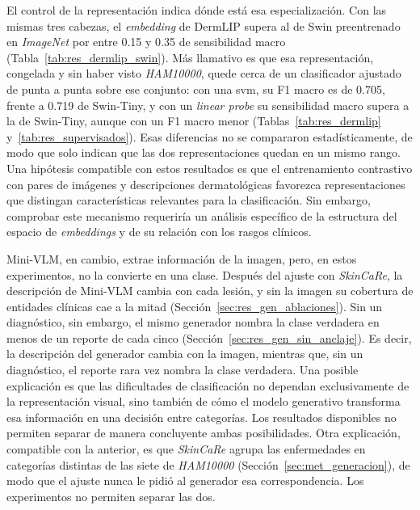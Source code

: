 El control de la representación indica dónde está esa especialización. Con las mismas tres cabezas, el
\emph{embedding} de DermLIP supera al de Swin preentrenado en \emph{ImageNet} por entre 0.15 y 0.35 de sensibilidad
macro (Tabla~\ref{tab:res_dermlip_swin}). Más llamativo es que esa representación, congelada y sin haber visto
\emph{HAM10000}, quede cerca de un clasificador ajustado de punta a punta sobre ese conjunto: con una \gls{svm}, su F1
macro es de 0.705, frente a 0.719 de Swin-Tiny, y con un \emph{linear probe} su sensibilidad macro supera a la de
Swin-Tiny, aunque con un F1 macro menor (Tablas~\ref{tab:res_dermlip} y~\ref{tab:res_supervisados}). Esas diferencias
no se compararon estadísticamente, de modo que solo indican que las dos representaciones quedan en un mismo rango. Una hipótesis compatible con estos resultados es que el entrenamiento contrastivo con pares de imágenes y descripciones dermatológicas favorezca representaciones que distingan características relevantes para la clasificación. Sin embargo, comprobar este mecanismo requeriría un análisis específico de la estructura del espacio de \emph{embeddings} y de su relación con los rasgos clínicos.

Mini-VLM, en cambio, extrae información de la imagen, pero, en estos experimentos, no la convierte en una clase. Después del
ajuste con \emph{SkinCaRe}, la descripción de Mini-VLM cambia con cada lesión, y sin la imagen su cobertura de
entidades clínicas cae a la mitad (Sección~\ref{sec:res_gen_ablaciones}). Sin un diagnóstico, sin embargo, el mismo
generador nombra la clase verdadera en menos de un reporte de cada cinco (Sección~\ref{sec:res_gen_sin_anclaje}). Es decir, la descripción del generador cambia con la imagen, mientras que, sin un diagnóstico, el reporte rara vez
nombra la clase verdadera. Una posible explicación es que las dificultades de clasificación no dependan exclusivamente de la representación visual, sino también de cómo el modelo generativo transforma esa información en una decisión entre categorías. Los resultados disponibles no permiten separar de manera concluyente ambas posibilidades.
Otra explicación, compatible con la anterior, es que \emph{SkinCaRe} agrupa las enfermedades en categorías distintas
de las siete de \emph{HAM10000} (Sección~\ref{sec:met_generacion}), de modo que el ajuste nunca le pidió al generador
esa correspondencia. Los experimentos no permiten separar las dos.

